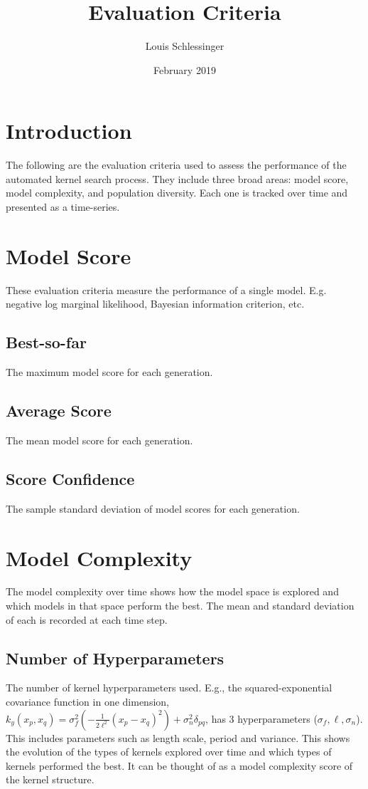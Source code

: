 \documentclass{article}
\title{Evaluation Criteria}
\author{Louis Schlessinger}
\date{February 2019}
\begin{document}
\maketitle

\section{Introduction}

The following are the evaluation criteria used to assess the performance of the automated kernel search process. They include three broad areas: model score, model complexity, and population diversity. Each one is tracked over time and presented as a time-series.

\section{Model Score}
These evaluation criteria measure the performance of a single model. E.g. negative log marginal likelihood, Bayesian information criterion, etc.
\subsection{Best-so-far}
The maximum model score for each generation.
\subsection{Average Score}
The mean model score for each generation.
\subsection{Score Confidence}
The sample standard deviation of model scores for each generation. 
\section{Model Complexity}
The model complexity over time shows how the model space is explored and which models in that space perform the best. The mean and standard deviation of each is recorded at each time step.
\subsection{Number of Hyperparameters}
The number of kernel hyperparameters used. E.g., the squared-exponential covariance function in one dimension, $k_y(x_p, x_q)=\sigma_{f}^{2}(-\frac{1}{2\ell^2}(x_p - x_q)^2)+\sigma_{n}^{2}\delta_{pq}$, has 3 hyperparameters ($\sigma_{f}, \ell,\sigma_{n}$). This includes parameters such as length scale, period and variance. This shows the evolution of the types of kernels explored over time and which types of kernels performed the best. It can be thought of as a model complexity score of the kernel structure.
\end{document}
